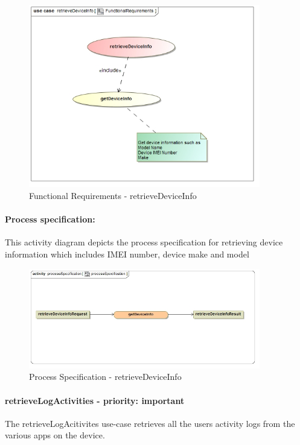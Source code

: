 \documentclass[hidelinks, 12pt, oneside]{article}
\begin{document}
		\begin{figure}[!htbp]
    		\centering
    		\includegraphics[width=0.9\textwidth]{img/functionalRequirementsRetrieveDeviceInfo.jpg}
    		\caption{Functional Requirements - retrieveDeviceInfo}
    		\label{fig:FunctionalReq_retrieveDeviceInfo}
		\end{figure}
		
		
		\paragraph{Process specification:}
		This activity diagram depicts the process specification for retrieving device information which includes IMEI number, device make and model
		
		\begin{figure}[!htbp]
    		\centering
    		\includegraphics[width=0.9\textwidth]{img/processSpecificationRetrieveDeviceInfo.jpg}
    		\caption{Process Specification - retrieveDeviceInfo}
    		\label{fig:ProcessSpec_retrieveDeviceInfo}
		\end{figure}
		
		
		\paragraph{retrieveLogActivities - priority: important}
		The retrieveLogAcitivites use-case retrieves all the users activity logs from the various apps on the device.\newpage
		
\end{document}
